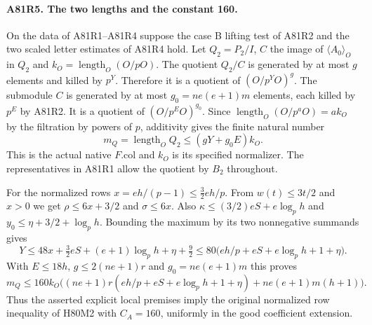 \paragraph{A81R5. The two lengths and the constant 160.}
On the data of A81R1--A81R4 suppose the case B lifting test of
A81R2 and the two scaled letter estimates of A81R4 hold.
Let $Q_2=P_2/I$, $C$ the image of $\langle A_0\rangle_O$ in
$Q_2$ and $k_O=\operatorname{length}_O(O/pO)$.
The quotient $Q_2/C$ is generated by at most $g$ elements and
killed by $p^Y$. Therefore it is a quotient of $(O/p^Y O)^g$.
The submodule $C$ is generated by at most $g_0=ne(e+1)m$
elements, each killed by $p^E$ by A81R2. It is a quotient
of $(O/p^EO)^{g_0}$. Since
$\operatorname{length}_O(O/p^aO)=a k_O$ by the filtration by
powers of $p$, additivity gives the finite natural number
\[
 m_Q=\operatorname{length}_O Q_2\le(gY+g_0 E)k_O .
\]
This is the actual native $F.\mathrm{col}$ and $k_O$ is its
specified normalizer. The representatives in A81R1 allow the
quotient by $B_2$ throughout.

For the normalized rows $x=eh/(p-1)\le\tfrac32 eh/p$. From
$w(t)\le3t/2$ and $x>0$ we get
$\rho\le6x+3/2$ and $\sigma\le6x$. Also
$\kappa\le(3/2)eS+e\log_p h$ and
$y_0\le\eta+3/2+\log_p h$. Bounding the maximum by its
two nonnegative summands gives
\[
 Y\le48x+\tfrac32 eS+(e+1)\log_p h+\eta+\tfrac92
 \le80\big(eh/p+eS+e\log_p h+1+\eta\big).
\]
With $E\le18h$, $g\le2(ne+1)r$ and $g_0=ne(e+1)m$ this proves
\[
 m_Q\le160k_O\Big((ne+1)r(eh/p+eS+e\log_p h+1+\eta)
                         +ne(e+1)m(h+1)\Big).
\]
Thus the asserted explicit local premises imply the original
normalized row inequality of H80M2 with $C_A=160$, uniformly in
the good coefficient extension.

